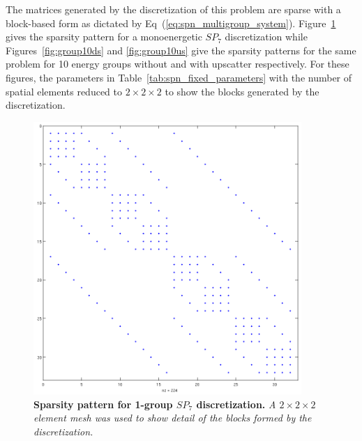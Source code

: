 The matrices generated by the discretization of this problem are
sparse with a block-based form as dictated by
Eq~(\ref{eq:spn_multigroup_system}). Figure~\ref{fig:group1} gives the
sparsity pattern for a monoenergetic $SP_7$ discretization while
Figures~\ref{fig:group10ds} and \ref{fig:group10us} give the sparsity
patterns for the same problem for 10 energy groups without and with
upscatter respectively. For these figures, the parameters in
Table~\ref{tab:spn_fixed_parameters} with the number of spatial
elements reduced to $2 \times 2 \times 2$ to show the blocks generated
by the discretization.
\begin{figure}[t!]
  \begin{center}
    \includegraphics[width=4in]{chapters/spn_equations/group1.png}
  \end{center}
  \caption{\textbf{Sparsity pattern for 1-group $SP_7$
      discretization.} \textit{A $2\times 2 \times 2$ element mesh was
      used to show detail of the blocks formed by the discretization.}}
  \label{fig:group1}
\end{figure}

